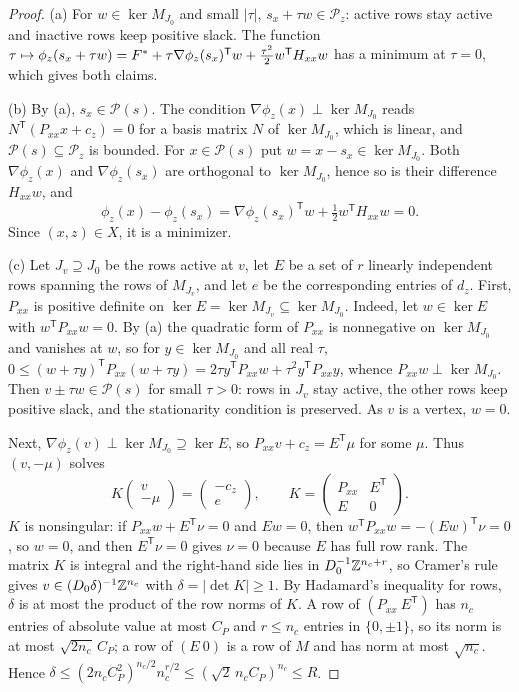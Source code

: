 \begin{proof}
(a) For $w\in\ker M_{J_0}$ and small $\lvert\tau\rvert$, $s_x+\tau w\in\mathcal P_z$:
active rows stay active and inactive rows keep positive slack. The function
$\tau\mapsto\phi_z(s_x+\tau w)=F^*+\tau\nabla\phi_z(s_x)^{\mathsf T}w+\frac{\tau^2}{2}w^{\mathsf T}H_{xx}w$
has a minimum at $\tau=0$, which gives both claims.

(b) By (a), $s_x\in\mathcal P(s)$. The condition
$\nabla\phi_z(x)\perp\ker M_{J_0}$ reads $N^{\mathsf T}(P_{xx}x+c_z)=0$ for a basis
matrix $N$ of $\ker M_{J_0}$, which is linear, and $\mathcal P(s)\subseteq\mathcal P_z$
is bounded. For $x\in\mathcal P(s)$ put $w=x-s_x\in\ker M_{J_0}$. Both
$\nabla\phi_z(x)$ and $\nabla\phi_z(s_x)$ are orthogonal to $\ker M_{J_0}$, hence so
is their difference $H_{xx}w$, and
\[
\phi_z(x)-\phi_z(s_x)=\nabla\phi_z(s_x)^{\mathsf T}w+\tfrac12w^{\mathsf T}H_{xx}w=0 .
\]
Since $(x,z)\in X$, it is a minimizer.

(c) Let $J_v\supseteq J_0$ be the rows active at $v$, let $E$ be a set of
$r$ linearly independent rows spanning the rows of $M_{J_v}$, and let $e$ be
the corresponding entries of $d_z$. First, $P_{xx}$ is positive definite on
$\ker E=\ker M_{J_v}\subseteq\ker M_{J_0}$. Indeed, let $w\in\ker E$ with
$w^{\mathsf T}P_{xx}w=0$. By (a) the quadratic form of $P_{xx}$ is nonnegative on
$\ker M_{J_0}$ and vanishes at $w$, so for $y\in\ker M_{J_0}$ and all real
$\tau$, $0\le(w+\tau y)^{\mathsf T}P_{xx}(w+\tau y)=2\tau y^{\mathsf T}P_{xx}w+\tau^2y^{\mathsf T}P_{xx}y$,
whence $P_{xx}w\perp\ker M_{J_0}$. Then $v\pm\tau w\in\mathcal P(s)$ for small
$\tau>0$: rows in $J_v$ stay active, the other rows keep positive slack, and
the stationarity condition is preserved. As $v$ is a vertex, $w=0$.

Next, $\nabla\phi_z(v)\perp\ker M_{J_0}\supseteq\ker E$, so
$P_{xx}v+c_z=E^{\mathsf T}\mu$ for some $\mu$. Thus $(v,-\mu)$ solves
\[
K\begin{pmatrix}v\\ -\mu\end{pmatrix}=\begin{pmatrix}-c_z\\ e\end{pmatrix},\qquad
K=\begin{pmatrix}P_{xx}&E^{\mathsf T}\\ E&0\end{pmatrix}.
\]
$K$ is nonsingular: if $P_{xx}w+E^{\mathsf T}\nu=0$ and $Ew=0$, then
$w^{\mathsf T}P_{xx}w=-(Ew)^{\mathsf T}\nu=0$, so $w=0$, and then $E^{\mathsf T}\nu=0$ gives $\nu=0$
because $E$ has full row rank. The matrix $K$ is integral and the right-hand
side lies in $D_0^{-1}\mathbb Z^{n_c+r}$, so Cramer's rule gives
$v\in(D_0\delta)^{-1}\mathbb Z^{n_c}$ with $\delta=\lvert\det K\rvert\ge1$. By Hadamard's
inequality for rows, $\delta$ is at most the product of the row norms of $K$.
A row of $(P_{xx}\ E^{\mathsf T})$ has $n_c$ entries of absolute value at most $C_P$
and $r\le n_c$ entries in $\{0,\pm1\}$, so its norm is at most
$\sqrt{2n_c}\,C_P$; a row of $(E\ 0)$ is a row of $M$ and has norm at most
$\sqrt{n_c}$. Hence
$\delta\le(2n_cC_P^2)^{n_c/2}n_c^{r/2}\le(\sqrt2\,n_cC_P)^{n_c}\le R$.
\end{proof}

